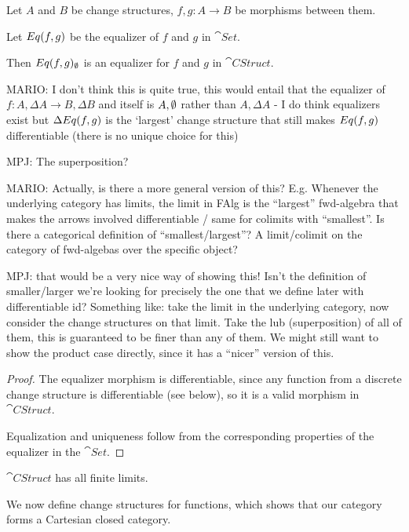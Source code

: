 \begin{prop}[Equalizers]
  Let $A$ and $B$ be change structures, $f, g: A \rightarrow B$ be morphisms
  between them.

  Let $Eq(f, g)$ be the equalizer of $f$ and $g$ in $\cat{Set}$.

  Then $Eq(f, g)_\emptyset$ is an equalizer for $f$ and $g$
  in $\cat{CStruct}$.

  MARIO: I don't think this is quite true, this would entail that the equalizer of
  $f : A, \Delta A \rightarrow B,\Delta B$ and itself is $A, \emptyset$ rather than
  $A, \Delta A$ - I do think equalizers exist but $\Delta Eq(f, g)$ is the
  `largest' change structure that still makes $Eq(f, g)$ differentiable (there
  is no unique choice for this)

  MPJ: The superposition?

  MARIO: Actually, is there a more general version of this? E.g. Whenever the underlying
  category has limits, the limit in FAlg is the ``largest'' fwd-algebra that makes the arrows
  involved differentiable / same for colimits with ``smallest''. Is there a categorical definition
  of ``smallest/largest''? A limit/colimit on the category of fwd-algebas over the specific object?

  MPJ: that would be a very nice way of showing this! Isn't the definition of
  smaller/larger we're looking for precisely the one that we define later with
  differentiable id? Something like: take the limit in the underlying category,
  now consider the change structures on that limit. Take the lub (superposition)
  of all of them, this is guaranteed to be finer than any of them. We might
  still want to show the product case directly, since it has a ``nicer'' version
  of this.
\end{prop}
\begin{proof}
  The equalizer morphism is differentiable, since any function from a discrete change
  structure is differentiable (see below), so it is a valid morphism in $\cat{CStruct}$.

  Equalization and uniqueness follow from the corresponding properties of the
  equalizer in the $\cat{Set}$.
\end{proof}

\begin{thm}
  $\cat{CStruct}$ has all finite limits.
\end{thm}

We now define change structures for functions, which shows that our category
forms a Cartesian closed category.

